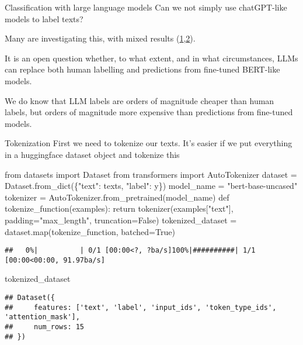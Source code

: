 \documentclass[
  10pt,
  ignorenonframetext,
  aspectratio=169]{beamer}
\newenvironment{Shaded}{\begin{snugshade}}{\end{snugshade}}
\newcommand{\BuiltInTok}[1]{\textcolor[rgb]{0.80,0.80,0.80}{#1}}
\newcommand{\ControlFlowTok}[1]{\textcolor[rgb]{0.94,0.87,0.69}{#1}}
\newcommand{\ImportTok}[1]{\textcolor[rgb]{0.80,0.80,0.80}{#1}}
\newcommand{\KeywordTok}[1]{\textcolor[rgb]{0.94,0.87,0.69}{#1}}
\newcommand{\NormalTok}[1]{\textcolor[rgb]{0.80,0.80,0.80}{#1}}
\newcommand{\OperatorTok}[1]{\textcolor[rgb]{0.94,0.94,0.82}{#1}}
\newcommand{\StringTok}[1]{\textcolor[rgb]{0.80,0.58,0.58}{#1}}
\newcommand{\VariableTok}[1]{\textcolor[rgb]{0.80,0.80,0.80}{#1}}
\begin{document}
\begin{frame}{Classification with large language models}
\protect\hypertarget{classification-with-large-language-models}{}
Can we not simply use chatGPT-like models to label texts?

Many are investigating this, with mixed results
(\href{https://arxiv.org/abs/2311.05769}{1},\href{https://arxiv.org/abs/2305.03514}{2}).

It is an open question whether, to what extent, and in what
circumstances, LLMs can replace both human labelling and predictions
from fine-tuned BERT-like models.

We do know that LLM labels are orders of magnitude cheaper than human
labels, but orders of magnitude more expensive than predictions from
fine-tuned models.
\end{frame}

\begin{frame}[fragile]{Tokenization}
\protect\hypertarget{tokenization}{}
First we need to tokenize our texts. It's easier if we put everything in
a huggingface dataset object and tokenize this

\medskip
\scriptsize

\begin{Shaded}
\begin{Highlighting}[]
\ImportTok{from}\NormalTok{ datasets }\ImportTok{import}\NormalTok{ Dataset}
\ImportTok{from}\NormalTok{ transformers }\ImportTok{import}\NormalTok{ AutoTokenizer}
\NormalTok{dataset }\OperatorTok{=}\NormalTok{ Dataset.from\_dict(\{}\StringTok{"text"}\NormalTok{: texts, }\StringTok{"label"}\NormalTok{: y\})}
\NormalTok{model\_name }\OperatorTok{=} \StringTok{"bert{-}base{-}uncased"}
\NormalTok{tokenizer }\OperatorTok{=}\NormalTok{ AutoTokenizer.from\_pretrained(model\_name)}
\KeywordTok{def}\NormalTok{ tokenize\_function(examples):}
    \ControlFlowTok{return}\NormalTok{ tokenizer(examples[}\StringTok{"text"}\NormalTok{], padding}\OperatorTok{=}\StringTok{"max\_length"}\NormalTok{, truncation}\OperatorTok{=}\VariableTok{False}\NormalTok{)}
\NormalTok{tokenized\_dataset }\OperatorTok{=}\NormalTok{ dataset.}\BuiltInTok{map}\NormalTok{(tokenize\_function, batched}\OperatorTok{=}\VariableTok{True}\NormalTok{)}
\end{Highlighting}
\end{Shaded}

\begin{verbatim}
##   0%|          | 0/1 [00:00<?, ?ba/s]100%|##########| 1/1 [00:00<00:00, 91.97ba/s]
\end{verbatim}

\begin{Shaded}
\begin{Highlighting}[]
\NormalTok{tokenized\_dataset}
\end{Highlighting}
\end{Shaded}

\begin{verbatim}
## Dataset({
##     features: ['text', 'label', 'input_ids', 'token_type_ids', 'attention_mask'],
##     num_rows: 15
## })
\end{verbatim}
\end{frame}
\end{document}
